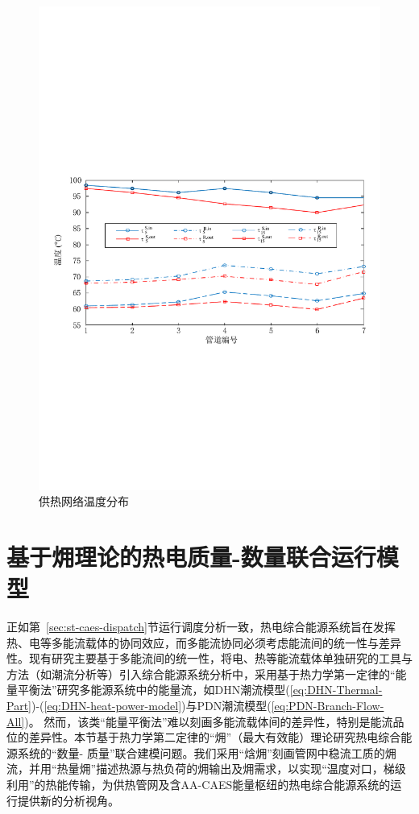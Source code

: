 \begin{figure}[H]
\centering
\includegraphics[scale=0.62]{figures/Chap4-15-Hub-Dispatch-Exe-Pipe-Temp.pdf}
\caption{供热网络温度分布}
\label{Fig:Hub-Dispatch-Exe-Pipe-Temp}
\end{figure}



\section{基于㶲理论的热电质量-数量联合运行模型}
\label{sec:exergy-IES-model}
正如第~\ref{sec:st-caes-dispatch}节运行调度分析一致，热电综合能源系统旨在发挥热、电等多能流载体的协同效应，而多能流协同必须考虑能流间的统一性与差异性。现有研究主要基于多能流间的统一性，将电、热等能流载体单独研究的工具与方法（如潮流分析等）引入综合能源系统分析中，采用基于热力学第一定律的“能量平衡法”研究多能源系统中的能量流，如DHN潮流模型(\ref{eq:DHN-Thermal-Part})-(\ref{eq:DHN-heat-power-model})与PDN潮流模型(\ref{eq:PDN-Branch-Flow-All})。 然而，该类“能量平衡法”难以刻画多能流载体间的差异性，特别是能流品位的差异性。本节基于热力学第二定律的“㶲”（最大有效能）理论\cite{Eng-Thermo-83}研究热电综合能源系统的“数量- 质量”联合建模问题。我们采用“焓㶲”刻画管网中稳流工质的㶲流，并用“热量㶲”描述热源与热负荷的㶲输出及㶲需求，以实现“温度对口，梯级利用”的热能传输，为供热管网及含AA-CAES能量枢纽的热电综合能源系统的运行提供新的分析视角。

